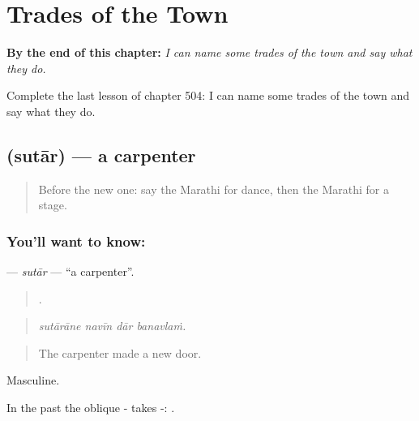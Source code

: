 
\chapter{Trades of the Town}
\label{ch:mr-trades-of-the-town}

\begin{chapteropening}
\textbf{By the end of this chapter:} \emph{I can name some trades of the town and say what they do.}

Complete the last lesson of chapter 504: I can name some trades of the town and say what they do.
\end{chapteropening}

\section[\texorpdfstring{\mr{सुतार} (sutār)}{सुतार (sutār)}]{ (sutār) — a carpenter}

\label{lesson:MR-C504-sutar}



\begin{quote}
Before the new one: say the Marathi for dance, then the Marathi for a stage.
\end{quote}

\subsection*{You'll want to know: }
\textbf{} — \emph{sutār} — \textquotedblleft{}a carpenter\textquotedblright{}.

\begin{quote}
   .
\end{quote}

\begin{quote}
\emph{sutārāne navīn dār banavlaṁ.}
\end{quote}

\begin{quote}
The carpenter made a new door.
\end{quote}

Masculine.

In the past the oblique - takes -:   .

